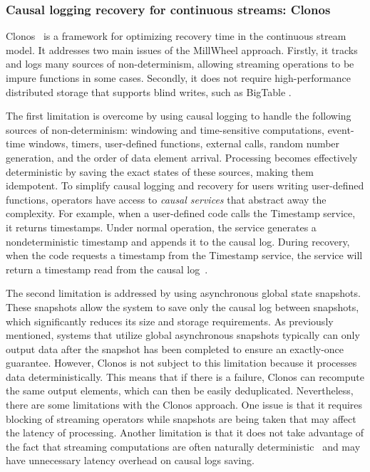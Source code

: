 \subsubsection{Causal logging recovery for continuous streams: Clonos}

Clonos~\cite{silvestre2021clonos} is a framework for optimizing recovery time in the continuous stream model. It addresses two main issues of the MillWheel approach. Firstly, it tracks and logs many sources of non-determinism, allowing streaming operations to be impure functions in some cases. Secondly, it does not require high-performance distributed storage that supports blind writes, such as BigTable \cite{chang2008bigtable}.

The first limitation is overcome by using causal logging to handle the following sources of non-determinism: windowing and time-sensitive computations, event-time windows, timers, user-defined functions, external calls, random number generation, and the order of data element arrival. Processing becomes effectively deterministic by saving the exact states of these sources, making them idempotent. To simplify causal logging and recovery for users writing user-defined functions, operators have access to {\em causal services} that abstract away the complexity. For example, when a user-defined code calls the Timestamp service, it returns timestamps. Under normal operation, the service generates a nondeterministic timestamp and appends it to the causal log. During recovery, when the code requests a timestamp from the Timestamp service, the service will return a timestamp read from the causal log~\cite{silvestre2021clonos}.

The second limitation is addressed by using asynchronous global state snapshots. These snapshots allow the system to save only the causal log between snapshots, which significantly reduces its size and storage requirements. As previously mentioned, systems that utilize global asynchronous snapshots typically can only output data after the snapshot has been completed to ensure an exactly-once guarantee. However, Clonos is not subject to this limitation because it processes data deterministically. This means that if there is a failure, Clonos can recompute the same output elements, which can then be easily deduplicated. Nevertheless, there are some limitations with the Clonos approach. One issue is that it requires blocking of streaming operators while snapshots are being taken that may affect the latency of processing. Another limitation is that it does not take advantage of the fact that streaming computations are often naturally deterministic~\cite{Wang:2019:LSF:3341301.3359653, silvestre2021clonos} and may have unnecessary latency overhead on causal logs saving.

